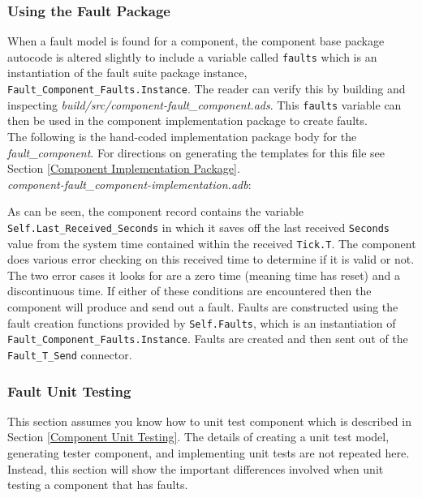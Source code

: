 \subsubsection{Using the Fault Package}

When a fault model is found for a component, the component base package autocode is altered slightly to include a variable called \texttt{faults} which is an instantiation of the fault suite package instance, \texttt{Fault\_Component\_Faults.Instance}. The reader can verify this by building and inspecting \textit{build/src/component-fault\_component.ads}. This \texttt{faults} variable can then be used in the component implementation package to create faults. \\

The following is the hand-coded implementation package body for the \textit{fault\_component}. For directions on generating the templates for this file see Section \ref{Component Implementation Package}. \\

\textit{component-fault\_component-implementation.adb}:

As can be seen, the component record contains the variable \texttt{Self.Last\_Received\_Seconds} in which it saves off the last received \texttt{Seconds} value from the system time contained within the received \texttt{Tick.T}. The component does various error checking on this received time to determine if it is valid or not. The two error cases it looks for are a zero time (meaning time has reset) and a discontinuous time. If either of these conditions are encountered then the component will produce and send out a fault. Faults are constructed using the fault creation functions provided by \texttt{Self.Faults}, which is an instantiation of \texttt{Fault\_Component\_Faults.Instance}. Faults are created and then sent out of the \texttt{Fault\_T\_Send} connector.

\subsubsection{Fault Unit Testing}

This section assumes you know how to unit test component which is described in Section \ref{Component Unit Testing}. The details of creating a unit test model, generating tester component, and implementing unit tests are not repeated here. Instead, this section will show the important differences involved when unit testing a component that has faults. \\

